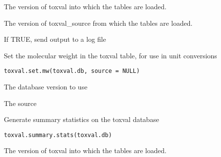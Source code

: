 \documentclass[letterpaper]{book}
\begin{document}
%
\begin{Arguments}
\begin{ldescription}
\item[\code{toxval.db}] The version of toxval into which the tables are loaded.

\item[\code{source.db}] The version of toxval\_source from which the tables are loaded.

\item[\code{log}] If TRUE, send output to a log file
\end{ldescription}
\end{Arguments}
%
\begin{Description}\relax
Set the molecular weight in the toxval table, for use in unit conversions
\end{Description}
%
\begin{Usage}
\begin{verbatim}
toxval.set.mw(toxval.db, source = NULL)
\end{verbatim}
\end{Usage}
%
\begin{Arguments}
\begin{ldescription}
\item[\code{toxval.db}] The database version to use

\item[\code{source}] The source
\end{ldescription}
\end{Arguments}
%
\begin{Description}\relax
Generate summary statistics on the toxval database
\end{Description}
%
\begin{Usage}
\begin{verbatim}
toxval.summary.stats(toxval.db)
\end{verbatim}
\end{Usage}
%
\begin{Arguments}
\begin{ldescription}
\item[\code{toxval.db}] The version of toxval into which the tables are loaded.
\end{ldescription}
\end{Arguments}
\printindex{}
\end{document}
